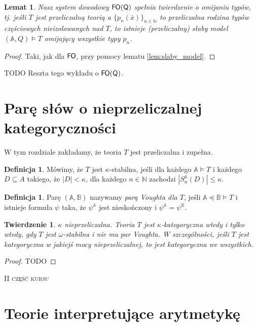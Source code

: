 \documentclass{article}
\newcommand{\N}{\mathbb{N}}
\newcommand{\A}{\mathbb{A}}
\newcommand{\B}{\mathbb{B}}
\theoremstyle{plain}
\newtheorem{tw}[thm]{Twierdzenie}
\newtheorem{lem}[thm]{Lemat}
\theoremstyle{definition}
\newtheorem{df}[thm]{Definicja}
\theoremstyle{remark}
\newcommand{\FO}{\mathsf{F \mkern-1.4mu O}}
\newcommand{\q}{\mathsf{Q}}
\begin{document}
\begin{lem}
	Nasz system dowodowy $\FO(\q)$ spełnia twierdzenie o omijaniu typów,
	tj. jeśłi $T$ jest przeliczalną teorią a $\{p_n(\bar{x})\}_{n \in \N}$
	to przeliczalna rodzina typów częściowych nieizolowanych nad $T$,
	to istnieje (przeliczalny) słaby model $(\A, Q) \models T$ omijający
	wszystkie typy $p_n$.
\end{lem}
\begin{proof}
	Taki, jak dla $\FO$, przy pomocy lematu \ref{lem:slaby_model}.
\end{proof}

{\color{red} TODO Reszta tego wykładu o $\FO(\mathsf{Q})$.}



\section{Parę słów o nieprzeliczalnej kategoryczności}

W tym rozdziale zakładamy, że teoria $T$ jest przeliczalna i zupełna.

\begin{df}
	Mówimy, że $T$ jest $\kappa$-stabilna, jeśli dla każdego $\A \models T$
	i każdego $D \subseteq A$ takiego, że $|D| < \kappa$, dla każdego $n
	\in \N$ zachodzi $|S_n^{\A}(D)| \leq \kappa$.
\end{df}

\begin{df}
	Parę $(\A, \B)$ nazywamy \textit{parą Voughta dla $T$}, jeśli $\A
	\preccurlyeq \B \models T$ i istnieje formuła $\psi$ taka, że
	$\psi^{\A}$ jest nieskończony i $\psi^{\A} = \psi^{\B}$.
\end{df}

\begin{tw}
	 $\kappa$ nieprzeliczalna. Teoria $T$ jest $\kappa$-kategoryczna wtedy
	 i tylko wtedy, gdy $T$ jest $\omega$-stabilna i nie ma par Voughta.
	 W szczególności, jeśli $T$ jest kategoryczna w jakiejś mocy
	 nieprzeliczalnej, to jest kategoryczna we wszystkich.
\end{tw}
\begin{proof}
	\color{red} TODO
\end{proof}

\vspace{0.5cm}
\begin{center}
{\Large \textsc{II część kursu}}
\end{center}
\vspace{-0.4cm}
\section{Teorie interpretujące arytmetykę}
\end{document}
